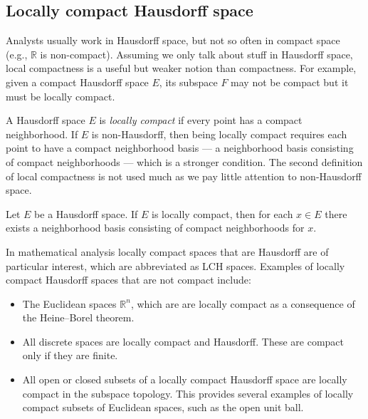 \subsection{Locally compact Hausdorff space}

Analysts usually work in Hausdorff space, but not so often in compact space (e.g., $\mathbb R$ is non-compact).
Assuming we only talk about stuff in Hausdorff space,
local compactness is
a useful but weaker notion than compactness.
For example, given a compact Hausdorff space $E$,
its subspace $F$ may not be compact but it must be locally compact.


A Hausdorff space $E$ is \textit{locally compact} if every point has a compact neighborhood.
If $E$ is non-Hausdorff, then being locally compact requires each point to have a compact neighborhood basis ---
a neighborhood basis consisting of compact neighborhoods --- which is a stronger condition.
The second definition of local compactness is not used much as we pay little attention to non-Hausdorff space.

\begin{qst}
  Let $E$ be a Hausdorff space. If $E$ is locally compact, then for each $x \in E$ there exists a neighborhood basis consisting of compact neighborhoods for $x$.
\end{qst}



In mathematical analysis locally compact spaces that are Hausdorff are of particular interest, which are abbreviated as LCH spaces.
Examples of locally compact Hausdorff spaces that are not compact include:
\begin{itemize}
  \item The Euclidean spaces $\mathbb R^n$, which are are locally compact as a consequence of the Heine--Borel theorem.
  \item All discrete spaces are locally compact and Hausdorff. These are compact only if they are finite.
  \item All open or closed subsets of a locally compact Hausdorff space are locally compact in the subspace topology. This provides several examples of locally compact subsets of Euclidean spaces, such as the open unit ball.

 
\end{itemize}
